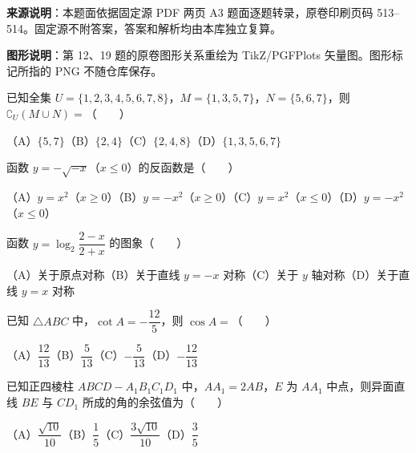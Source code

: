 


\begin{gktip}
\textbf{来源说明}：本题面依据固定源 PDF 两页 A3 题面逐题转录，原卷印刷页码 513–514。固定源不附答案，答案和解析均由本库独立复算。

\textbf{图形说明}：第 12、19 题的原卷图形关系重绘为 TikZ/PGFPlots 矢量图。图形标记所指的 PNG 不随仓库保存。
\end{gktip}


\begin{question}
已知全集 $U=\{1,2,3,4,5,6,7,8\}$，$M=\{1,3,5,7\}$，$N=\{5,6,7\}$，则 $\complement_U(M\cup N)=$\mbox{（　　）}

（A）$\{5,7\}$\quad（B）$\{2,4\}$\quad（C）$\{2,4,8\}$\quad（D）$\{1,3,5,6,7\}$

\end{question}
\begin{question}
函数 $y=-\sqrt{-x}$（$x\leqslant0$）的反函数是\mbox{（　　）}

（A）$y=x^2$（$x\geqslant0$）\quad（B）$y=-x^2$（$x\geqslant0$）\quad（C）$y=x^2$（$x\leqslant0$）\quad（D）$y=-x^2$（$x\leqslant0$）

\end{question}
\begin{question}
函数 $y=\log_2\dfrac{2-x}{2+x}$ 的图象\mbox{（　　）}

（A）关于原点对称\quad（B）关于直线 $y=-x$ 对称\quad（C）关于 $y$ 轴对称\quad（D）关于直线 $y=x$ 对称

\end{question}
\begin{question}
已知 $\triangle ABC$ 中，$\cot A=-\dfrac{12}{5}$，则 $\cos A=$\mbox{（　　）}

（A）$\dfrac{12}{13}$\quad（B）$\dfrac5{13}$\quad（C）$-\dfrac5{13}$\quad（D）$-\dfrac{12}{13}$

\end{question}
\begin{question}
已知正四棱柱 $ABCD-A_1B_1C_1D_1$ 中，$AA_1=2AB$，$E$ 为 $AA_1$ 中点，则异面直线 $BE$ 与 $CD_1$ 所成的角的余弦值为\mbox{（　　）}

（A）$\dfrac{\sqrt{10}}{10}$\quad（B）$\dfrac15$\quad（C）$\dfrac{3\sqrt{10}}{10}$\quad（D）$\dfrac35$

\end{question}
